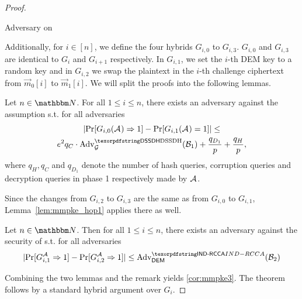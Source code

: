 \begin{proof}
\begin{figure*}
\begin{algobox}{Adversary \Bdv[1] on \sdh}
\begin{minipage}[t]{.49\linewidth}
\begin{algorithmic}
			\end{algorithmic}
		\end{minipage}
	\end{algobox}
	\caption{Description of adversary \Bdv[1] from \cref{thm:mmpke_security}.}
	\label{fig:mmpkeBdv1}
\end{figure*}
  Additionally, for $i\in[n]$, we define the four hybrids $G_{i,0}$ to $G_{i,3}$. $G_{i,0}$ and $G_{i,3}$ are identical
  to $G_i$ and $G_{i+1}$ respectively. In $G_{i,1}$, we set the $i$-th DEM key to a random key and in $G_{i,2}$ we swap
  the plaintext in the $i$-th challenge ciphertext from $\vec{m}_0[i]$ to $\vec{m}_1[i]$.
  We will split the proofs into the following lemmas.
  \begin{lemma}\label{lem:mmpke_hop1}
    Let $n\in\N$. For all $1\leq i \le n$, there exists an adversary \Bdv[1] against the \sdh assumption s.t. for all adversaries \Adv
    \begin{multline*}
      \abs{\Pr[G_{i,0}(\Adv)\Rightarrow 1]- \Pr[G_{i,1}({\Adv}) = 1]} \leq \\
      e^2q_C\cdot\adv{\sdh}{\Group}({\Bdv[1]}) + \frac{q_{D_1}}{p} + \frac{q_H}{p},
    \end{multline*}
    where $q_H, q_C$ and $q_{D_1}$ denote the number of hash queries, corruption queries and decryption queries in phase
    1 respectively made by $\mathcal{A}_{\relax}$.
  \end{lemma}
  \begin{remark}
    Since the changes from $G_{i,2}$ to $G_{i,3}$ are the same as from $G_{i,0}$ to $G_{i,1}$, Lemma~\ref{lem:mmpke_hop1} applies there as
    well.
  \end{remark}

  \begin{lemma}\label{lem:mmpke_hop2}
    Let $n\in\N$. Then for all $1\leq i \le n$, there exists an adversary \Bdv[2] against the \indrcca security of \dem s.t. for all adversaries \Adv
    \[
      \abs{\Pr[G_{i,1}^{\Adv}\Rightarrow 1]-\Pr[G_{i,2}^{\Adv}\Rightarrow 1]} \leq \adv{\indrcca}{\dem}({\Bdv[2]})
    \]
  \end{lemma}

  Combining the two lemmas and the remark yields \cref{cor:mmpke3}. The theorem follows by a standard hybrid
  argument over $G_i$.


\end{proof}
